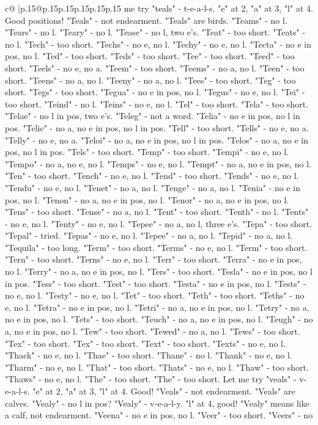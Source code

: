 \documentclass{article}
\begin{document}
{\begin{supertabular}{c@{$\;$}|p{.15\linewidth}@{}p{.15\linewidth}p{.15\linewidth}p{.15\linewidth}p{.15\linewidth}p{.15\linewidth}}
{{{me try "teals" {-} t{-}e{-}a{-}l{-}s. "e" at 2, "a" at 3, "l" at 4. Good positions! "Teals" {-} not endearment. "Teals" are birds. "Teams" {-} no l. "Tears" {-} no l. "Teary" {-} no l. "Tease" {-} no l, two e's. "Teat" {-} too short. "Teats" {-} no l. "Tech" {-} too short. "Techs" {-} no e, no l. "Techy" {-} no e, no l. "Tecta" {-} no e in pos, no l. "Ted" {-} too short. "Teds" {-} too short. "Tee" {-} too short. "Teed" {-} too short. "Teels" {-} no e, no a. "Teem" {-} too short. "Teems" {-} no a, no l. "Teen" {-} too short. "Teens" {-} no a, no l. "Teeny" {-} no a, no l. "Tees" {-} too short. "Teg" {-} too short. "Tegs" {-} too short. "Tegua" {-} no e in pos, no l. "Tegus" {-} no e, no l. "Tei" {-} too short. "Teind" {-} no l. "Teins" {-} no e, no l. "Tel" {-} too short. "Tela" {-} too short. "Telae" {-} no l in pos, two e's. "Teleg" {-} not a word. "Telia" {-} no e in pos, no l in pos. "Telic" {-} no a, no e in pos, no l in pos. "Tell" {-} too short. "Tells" {-} no e, no a. "Telly" {-} no e, no a. "Teloi" {-} no a, no e in pos, no l in pos. "Telos" {-} no a, no e in pos, no l in pos. "Tels" {-} too short. "Temp" {-} too short. "Tempi" {-} no e, no l. "Tempo" {-} no a, no e, no l. "Temps" {-} no e, no l. "Tempt" {-} no a, no e in pos, no l. "Ten" {-} too short. "Tench" {-} no e, no l. "Tend" {-} too short. "Tends" {-} no e, no l. "Tendu" {-} no e, no l. "Tenet" {-} no a, no l. "Tenge" {-} no a, no l. "Tenia" {-} no e in pos, no l. "Tenon" {-} no a, no e in pos, no l. "Tenor" {-} no a, no e in pos, no l. "Tens" {-} too short. "Tense" {-} no a, no l. "Tent" {-} too short. "Tenth" {-} no l. "Tents" {-} no e, no l. "Tenty" {-} no e, no l. "Tepee" {-} no a, no l, three e's. "Tepa" {-} too short. "Tepal" {-} tried. "Tepas" {-} no e, no l. "Tepee" {-} no a, no l. "Tepid" {-} no a, no l. "Tequila" {-} too long. "Term" {-} too short. "Terms" {-} no e, no l. "Term" {-} too short. "Tern" {-} too short. "Terns" {-} no e, no l. "Terr" {-} too short. "Terra" {-} no e in pos, no l. "Terry" {-} no a, no e in pos, no l. "Ters" {-} too short. "Tesla" {-} no e in pos, no l in pos. "Tess" {-} too short. "Test" {-} too short. "Testa" {-} no e in pos, no l. "Tests" {-} no e, no l. "Testy" {-} no e, no l. "Tet" {-} too short. "Teth" {-} too short. "Teths" {-} no e, no l. "Tetra" {-} no e in pos, no l. "Tetri" {-} no a, no e in pos, no l. "Tetry" {-} no a, no e in pos, no l. "Tets" {-} too short. "Teuch" {-} no a, no e in pos, no l. "Teugh" {-} no a, no e in pos, no l. "Tew" {-} too short. "Tewed" {-} no a, no l. "Tews" {-} too short. "Tex" {-} too short. "Tex" {-} too short. "Text" {-} too short. "Texts" {-} no e, no l. "Thack" {-} no e, no l. "Thae" {-} too short. "Thane" {-} no l. "Thank" {-} no e, no l. "Tharm" {-} no e, no l. "That" {-} too short. "Thats" {-} no e, no l. "Thaw" {-} too short. "Thaws" {-} no e, no l. "The" {-} too short. "The" {-} too short. Let me try "veals" {-} v{-}e{-}a{-}l{-}s. "e" at 2, "a" at 3, "l" at 4. Good! "Veals" {-} not endearment. "Veals" are calves. "Vealy" {-} no l in pos? "Vealy" {-} v{-}e{-}a{-}l{-}y. "l" at 4, good! "Vealy" means like a calf, not endearment. "Veena" {-} no e in pos, no l. "Veer" {-} too short. "Veers" {-} no }}}
\end{supertabular}}
\end{document}
